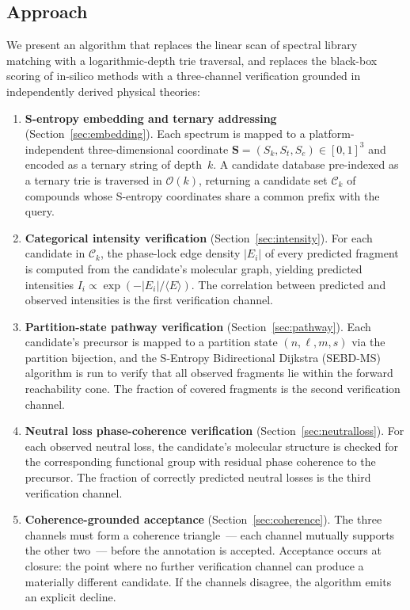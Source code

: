 \documentclass[twocolumn,10pt,a4paper]{article}
\theoremstyle{thmstyle}
\theoremstyle{definition}
\theoremstyle{remark}
\newcommand{\Sv}{\mathbf{S}}
\newcommand{\Sk}{S_{k}}
\newcommand{\St}{S_{t}}
\newcommand{\Se}{S_{e}}
\newcommand{\calC}{\mathcal{C}}
\begin{document}
\subsection{Approach}

We present an algorithm that replaces the linear scan of spectral
library matching with a logarithmic-depth trie traversal, and replaces
the black-box scoring of in-silico methods with a three-channel
verification grounded in independently derived physical theories:

\begin{enumerate}[nosep,label=(\roman*)]
\item \textbf{S-entropy embedding and ternary addressing}
  (Section~\ref{sec:embedding}). Each spectrum is mapped to a
  platform-independent three-dimensional coordinate
  $\Sv = (\Sk, \St, \Se) \in [0,1]^3$ and encoded as a ternary string
  of depth~$k$. A candidate database pre-indexed as a ternary trie is
  traversed in $\mathcal{O}(k)$, returning a candidate set
  $\calC_k$ of compounds whose S-entropy coordinates share a common
  prefix with the query.

\item \textbf{Categorical intensity verification}
  (Section~\ref{sec:intensity}). For each candidate in $\calC_k$,
  the phase-lock edge density $|E_i|$ of every predicted fragment is
  computed from the candidate's molecular graph, yielding predicted
  intensities $I_i \propto \exp(-|E_i|/\langle E \rangle)$. The
  correlation between predicted and observed intensities is the first
  verification channel.

\item \textbf{Partition-state pathway verification}
  (Section~\ref{sec:pathway}). Each candidate's precursor is mapped to
  a partition state $(n, \ell, m, s)$ via the partition bijection, and
  the S-Entropy Bidirectional Dijkstra (SEBD-MS) algorithm is run to
  verify that all observed fragments lie within the forward
  reachability cone. The fraction of covered fragments is the second
  verification channel.

\item \textbf{Neutral loss phase-coherence verification}
  (Section~\ref{sec:neutralloss}). For each observed neutral loss, the
  candidate's molecular structure is checked for the corresponding
  functional group with residual phase coherence to the precursor. The
  fraction of correctly predicted neutral losses is the third
  verification channel.

\item \textbf{Coherence-grounded acceptance}
  (Section~\ref{sec:coherence}). The three channels must form a
  coherence triangle~--- each channel mutually supports the other
  two~--- before the annotation is accepted. Acceptance occurs at
  closure: the point where no further verification channel can produce
  a materially different candidate. If the channels disagree, the
  algorithm emits an explicit decline.
\end{enumerate}
\end{document}
